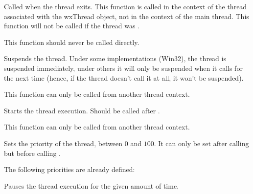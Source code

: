 \label{wxthreadonexit}


Called when the thread exits. This function is called in the context of the
thread associated with the wxThread object, not in the context of the main
thread. This function will not be called if the thread was
.

This function should never be called directly.

\label{wxthreadpause}


Suspends the thread. Under some implementations (Win32), the thread is
suspended immediately, under others it will only be suspended when it calls
 for the next time (hence, if the
thread doesn't call it at all, it won't be suspended).

This function can only be called from another thread context.

\label{wxthreadrun}


Starts the thread execution. Should be called after
.

This function can only be called from another thread context.

\label{wxthreadsetpriority}


Sets the priority of the thread, between $0$ and $100$. It can only be set
after calling  but before calling
.

The following priorities are already defined:

\twocolwidtha{7cm}
\begin{twocollist}\itemsep=0pt
\end{twocollist}

\label{wxthreadsleep}


Pauses the thread execution for the given amount of time.

